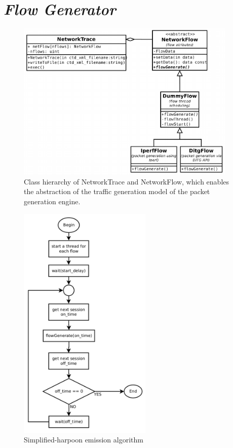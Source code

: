 \section{ \textit{Flow Generator} }

\begin{figure}[pht!]
    \centering
    \includegraphics[height=3.0in]{figures/ch3/trace-flow}
    \caption{Class hierarchy of NetworkTrace and NetworkFlow, which enables the abstraction of the traffic generation model of the packet generation engine.}
    \label{fig:network-trace-flow-class-diagram}
\end{figure}

\begin{figure}[pht!]
    \centering
    \includegraphics[height=4.5in]{figures/ch3/alg-simplified-harpoon}
    \caption{Simplified-harpoon emission algorithm}
    \label{fig:alg-simplified-harpoon}
\end{figure}


